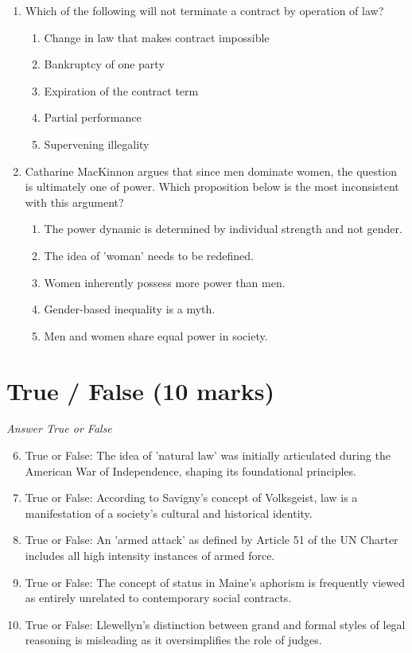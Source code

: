 \documentclass[12pt]{article}
\begin{document}
\begin{enumerate}[label=\arabic*.]
\begin{enumerate}[label=(\alph*)]
    \item Analytical
    \item Sociological
\end{enumerate}
\item Which of the following will not terminate a contract by operation of law?
\begin{enumerate}[label=(\alph*)]
    \item Change in law that makes contract impossible
    \item Bankruptcy of one party
    \item Expiration of the contract term
    \item Partial performance
    \item Supervening illegality
\end{enumerate}
\item Catharine MacKinnon argues that since men dominate women, the question is ultimately one of power. Which proposition below is the most inconsistent with this argument?
\begin{enumerate}[label=(\alph*)]
    \item The power dynamic is determined by individual strength and not gender.
    \item The idea of 'woman' needs to be redefined.
    \item Women inherently possess more power than men.
    \item Gender-based inequality is a myth.
    \item Men and women share equal power in society.
\end{enumerate}
\end{enumerate}

\section*{True / False (10 marks)}
\textit{Answer True or False}
\begin{enumerate}[label=\arabic*.]
\setcounter{enumi}{5}
\item True or False: The idea of 'natural law' was initially articulated during the American War of Independence, shaping its foundational principles.
\item True or False: According to Savigny's concept of Volksgeist, law is a manifestation of a society's cultural and historical identity.
\item True or False: An 'armed attack' as defined by Article 51 of the UN Charter includes all high intensity instances of armed force.
\item True or False: The concept of status in Maine's aphorism is frequently viewed as entirely unrelated to contemporary social contracts.
\item True or False: Llewellyn's distinction between grand and formal styles of legal reasoning is misleading as it oversimplifies the role of judges.
\end{enumerate}
\end{document}
